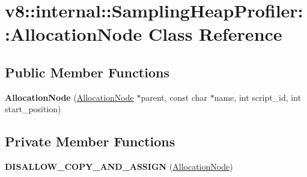 \hypertarget{classv8_1_1internal_1_1_sampling_heap_profiler_1_1_allocation_node}{}\section{v8\+:\+:internal\+:\+:Sampling\+Heap\+Profiler\+:\+:Allocation\+Node Class Reference}
\label{classv8_1_1internal_1_1_sampling_heap_profiler_1_1_allocation_node}
\subsection*{Public Member Functions}
\begin{DoxyCompactItemize}
\item 
{\bfseries Allocation\+Node} (\hyperlink{classv8_1_1internal_1_1_sampling_heap_profiler_1_1_allocation_node}{Allocation\+Node} $\ast$parent, const char $\ast$name, int script\+\_\+id, int start\+\_\+position)\hypertarget{classv8_1_1internal_1_1_sampling_heap_profiler_1_1_allocation_node_afa0aa2a60ef0ad8e092ffc11e49ba7b8}{}\label{classv8_1_1internal_1_1_sampling_heap_profiler_1_1_allocation_node_afa0aa2a60ef0ad8e092ffc11e49ba7b8}

\end{DoxyCompactItemize}
\subsection*{Private Member Functions}
\begin{DoxyCompactItemize}
\item 
{\bfseries D\+I\+S\+A\+L\+L\+O\+W\+\_\+\+C\+O\+P\+Y\+\_\+\+A\+N\+D\+\_\+\+A\+S\+S\+I\+GN} (\hyperlink{classv8_1_1internal_1_1_sampling_heap_profiler_1_1_allocation_node}{Allocation\+Node})\hypertarget{classv8_1_1internal_1_1_sampling_heap_profiler_1_1_allocation_node_a81048530f209735fdffc403075201c6a}{}\label{classv8_1_1internal_1_1_sampling_heap_profiler_1_1_allocation_node_a81048530f209735fdffc403075201c6a}

\end{DoxyCompactItemize}

